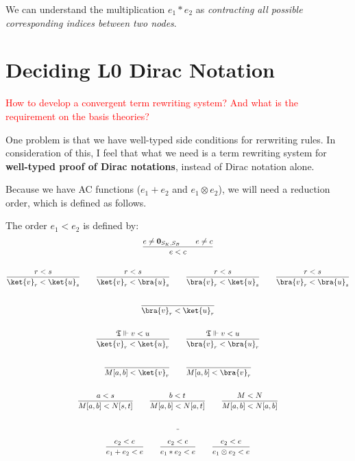 We can understand the multiplication $e_1 * e_2$ as \textit{contracting all possible corresponding indices between two nodes}.

\section{Deciding L0 Dirac Notation}

\textcolor{red}{How to develop a convergent term rewriting system? And what is the requirement on the basis theories?}

\vspace{1em}

One problem is that we have well-typed side conditions for rerwriting rules. In consideration of this, I feel that what we need is a term rewriting system for \textbf{well-typed proof of Dirac notations}, instead of Dirac notation alone.

\vspace{1em}
Because we have AC functions ($e_1 + e_2$ and $e_1 \otimes e_2$), we will need a reduction order, which is defined as follows.

\begin{definition}
  The order $e_1 < e_2$ is defined by:
  \begin{gather*}
    \frac{e \neq \textbf{0}_{S_K, S_B}\qquad e \neq c}{e < c}\\
    \ \\
    \frac{r < s}{\ket{v}_r < \ket{u}_s} \qquad \frac{r < s}{\ket{v}_r < \bra{u}_s}\qquad \frac{r < s}{\bra{v}_r < \ket{u}_s}\qquad \frac{r < s}{\bra{v}_r < \bra{u}_s}\\
    \ \\
    \frac{}{\bra{v}_r < \ket{u}_r} \\
    \ \\
    \frac{\mathfrak{T} \Vdash v < u}{\ket{v}_r < \ket{u}_r}\qquad\frac{\mathfrak{T} \Vdash v < u}{\bra{v}_r < \bra{u}_r}\\
    \ \\
    \frac{}{M[a, b] < \ket{v}_r}\qquad \frac{}{M[a, b] < \bra{v}_r}\\
    \ \\
    \frac{a < s}{M[a, b]<N[s, t]}\qquad \frac{b < t}{M[a, b]<N[a, t]}\qquad \frac{M < N}{M[a, b] < N[a, b]}\\
    \ \\
    \frac{}
    \ \\
    \frac{e_2 < e}{e_1 + e_2 < e}\qquad \frac{e_2 < e}{e_1 * e_2 < e} \qquad \frac{e_2 < e}{e_1 \otimes e_2 < e}
  \end{gather*}
\end{definition}

